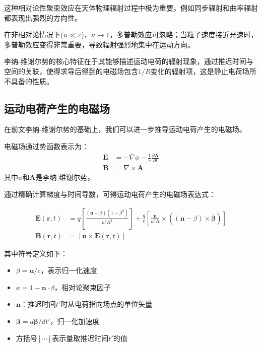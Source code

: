 这种相对论性聚束效应在天体物理辐射过程中极为重要，例如同步辐射和曲率辐射都表现出强烈的方向性。

\begin{derivationnote}[非相对论与相对论极限]
在非相对论情况下($u\ll c$)，$\kappa\to 1$，多普勒效应可忽略；当粒子速度接近光速时，多普勒效应变得非常重要，导致辐射强烈地集中在运动方向。
\end{derivationnote}

李纳-维谢尔势的核心特征在于其能够描述运动电荷的辐射现象，通过推迟时间与空间的关联，使得求导后得到的电磁场包含$1/R$变化的辐射项，这是静止电荷场所不具备的性质。

\subsection{运动电荷产生的电磁场}

在前文李纳-维谢尔势的基础上，我们可以进一步推导运动电荷产生的电磁场。

\begin{definition}[电磁场与推迟势的关系]
电磁场通过势函数表示为：
\begin{align}
\mathbf{E} &= -\nabla\phi - \frac{1}{c}\frac{\partial\mathbf{A}}{\partial t} \\
\mathbf{B} &= \nabla\times\mathbf{A}
\end{align}
其中$\phi$和$\mathbf{A}$是李纳-维谢尔势。
\end{definition}


通过精确计算梯度与时间导数，可得运动电荷产生的电磁场表达式：

\begin{align}
\mathbf{E}(\mathbf{r}, t) &= q\left[\frac{(\mathbf{n}-\beta)(1-\beta^{2})}{\kappa^{3}R^{2}}\right] + \frac{q}{c}\left[\frac{\mathbf{n}}{\kappa^{3}R} \times ((\mathbf{n}-\beta) \times \dot{\boldsymbol{\beta}})\right] \\
\mathbf{B}(\mathbf{r}, t) &= [\mathbf{n} \times \mathbf{E}(\mathbf{r}, t)]
\end{align}

其中符号定义如下：
\begin{itemize}
\item $\beta = \mathbf{u}/c$，表示归一化速度
\item $\kappa = 1 - \mathbf{n} \cdot \beta$，相对论聚束因子
\item $\mathbf{n}$：推迟时间$t'$时从电荷指向场点的单位矢量
\item $\dot{\boldsymbol{\beta}} = d\boldsymbol{\beta}/dt'$，归一化加速度
\item 方括号$[\cdots]$表示量取推迟时间$t'$的值
\end{itemize}

